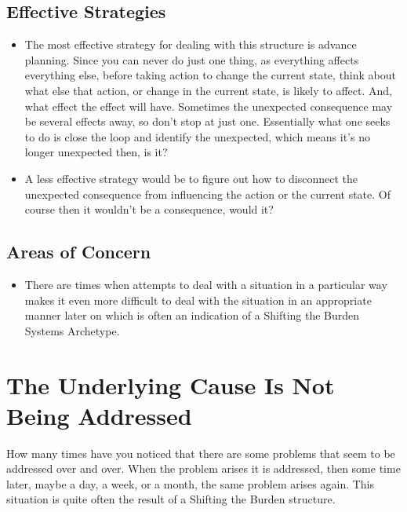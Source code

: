 \documentclass[]{memoir}
\begin{document}
\subsection{Effective Strategies}

\begin{itemize}
\itemsep1pt\parskip0pt
\item
  The most effective strategy for dealing with this structure is advance
  planning. Since you can never do just one thing, as everything affects
  everything else, before taking action to change the current state,
  think about what else that action, or change in the current state, is
  likely to affect. And, what effect the effect will have. Sometimes the
  unexpected consequence may be several effects away, so don't stop at
  just one. Essentially what one seeks to do is close the loop and
  identify the unexpected, which means it's no longer unexpected then,
  is it?
\item
  A less effective strategy would be to figure out how to disconnect the
  unexpected consequence from influencing the action or the current
  state. Of course then it wouldn't be a consequence, would it?
\end{itemize}

\subsection{Areas of Concern}

\begin{itemize}
\itemsep1pt\parskip0pt
\item
  There are times when attempts to deal with a situation in a particular
  way makes it even more difficult to deal with the situation in an
  appropriate manner later on which is often an indication of a Shifting
  the Burden Systems Archetype.
\end{itemize}

\section{The Underlying Cause Is Not Being Addressed}

How many times have you noticed that there are some problems that seem
to be addressed over and over. When the problem arises it is addressed,
then some time later, maybe a day, a week, or a month, the same problem
arises again. This situation is quite often the result of a Shifting the
Burden structure.
\end{document}
